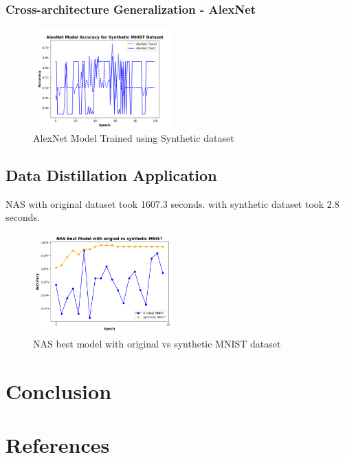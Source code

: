 \documentclass[conference, compsoc]{IEEEtran}
\begin{document}
\subsubsection{Cross-architecture Generalization - AlexNet}
\begin{figure}[H]
	\centering
	\includegraphics[width=0.48\textwidth]{mhist_alex_acc.png}
	\caption{AlexNet Model Trained using Synthetic dataset}
	\label{fig:mhist_alex_acc}
\end{figure}

\subsection{Data Distillation Application}
NAS with original dataset took 1607.3 seconds.
with synthetic dataset took 2.8 seconds.

\begin{figure}[H]
	\centering
	\includegraphics[width=0.48\textwidth]{nas_comparision.png}
	\caption{NAS best model with original vs synthetic MNIST dataset}
	\label{fig:nas_comparision}
\end{figure}
\section{Conclusion}

\section{References}
\nocite{*}
\printbibliography
\end{document}
